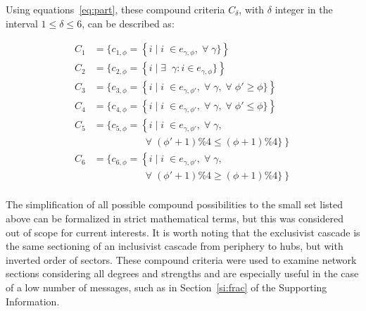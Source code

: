 \documentclass[%
	aip,
	jmp,%
	amsmath,amssymb,
	reprint,%
]{revtex4-1}
\begin{document}
Using equations~\ref{eq:part}, these compound criteria $C_\delta$, with $\delta$ integer in the interval $1\leq\delta\leq6$, can be described as:

\begin{equation}
	\begin{split}
		C_1&=\{c_{1,\phi}=\left\{i\mid i\;\in e_{\gamma,\phi}, \;\forall\; \gamma\}\right\} \\
		C_2&=\{c_{2,\phi}=\left\{i\mid \exists \;\;\gamma: i \in e_{\gamma,\phi}\}\right\} \\
		C_3&=\{c_{3,\phi}=\left\{i\mid i\;\in e_{\gamma,\phi'}, \;\forall\; \gamma,\;\forall\;\phi'\geq \phi\}\right\} \\
		C_4&=\{c_{4,\phi}=\left\{i\mid i\;\in e_{\gamma,\phi'}, \;\forall\; \gamma,\;\forall\;\phi'\leq \phi\}\right\} \\
		C_5&=\{c_{5,\phi}=\left\{i\mid i\;\in e_{\gamma,\phi'}, \;\forall\; \gamma,\right.\\
																																	&\;\;\;\;\;\;\;\;\;\;\;\;\;\;\;\;\;\; \left.\;\forall\;(\phi'+1)\%4\leq (\phi+1)\%4\}\right\} \\
		C_6&=\{c_{6,\phi}=\left\{i\mid i\;\in e_{\gamma,\phi'}, \;\forall\; \gamma,\right.\\
																																	&\;\;\;\;\;\;\;\;\;\;\;\;\;\;\;\;\;\; \left.\;\forall\;(\phi'+1)\%4\geq (\phi+1)\%4\}\right\} \\
	\end{split}
\end{equation}

The simplification of all possible compound possibilities to the small set listed above can be formalized in strict mathematical terms, but this was considered out of scope for current interests. It is worth noting that the exclusivist cascade is the same sectioning of an inclusivist cascade from periphery to hubs, but with inverted order of sectors. These compound criteria were used to examine network sections considering all degrees and strengths and are especially useful in the case of a low number of messages, such as in Section~\ref{si:frac} of the Supporting Information.
\end{document}
